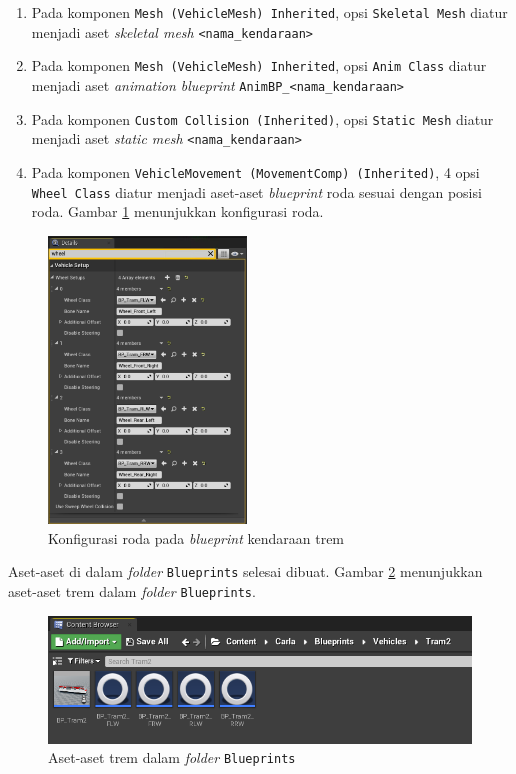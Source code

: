 \begin{enumerate}
    \item Pada komponen \verb|Mesh (VehicleMesh) Inherited|, opsi \verb|Skeletal Mesh|
    diatur menjadi aset \textit{skeletal mesh} \verb|<nama_kendaraan>|
    \item Pada komponen \verb|Mesh (VehicleMesh) Inherited|, opsi \verb|Anim Class|
    diatur menjadi aset \textit{animation blueprint}
    \verb|AnimBP_<nama_kendaraan>|
    \item Pada komponen \verb|Custom Collision (Inherited)|, opsi \verb|Static Mesh|
    diatur menjadi aset \textit{static mesh} \verb|<nama_kendaraan>|
    \item Pada komponen \verb|VehicleMovement (MovementComp) (Inherited)|, 4
    opsi \verb|Wheel Class| diatur menjadi aset-aset \textit{blueprint} roda
    sesuai dengan posisi roda. Gambar \ref{fig:tram-blueprint-wheels}
    menunjukkan konfigurasi roda.
\end{enumerate}

\begin{figure}[!h]
    \centering
    \includegraphics[width=0.47\textwidth]{resources/chapter-4/tram-blueprint-wheels.png}
    \caption{Konfigurasi roda pada \textit{blueprint} kendaraan trem}
    \label{fig:tram-blueprint-wheels}
\end{figure}

Aset-aset di dalam \textit{folder} \verb|Blueprints| selesai dibuat. Gambar
\ref{fig:tram-assets-in-blueprints-folder} menunjukkan aset-aset trem dalam
\textit{folder} \verb|Blueprints|.

\begin{figure}[!h]
    \centering
    \includegraphics[width=1\textwidth]{resources/chapter-4/tram-assets-in-blueprints-folder.png}
    \caption{Aset-aset trem dalam \textit{folder} \texttt{Blueprints}}
    \label{fig:tram-assets-in-blueprints-folder}
\end{figure}

